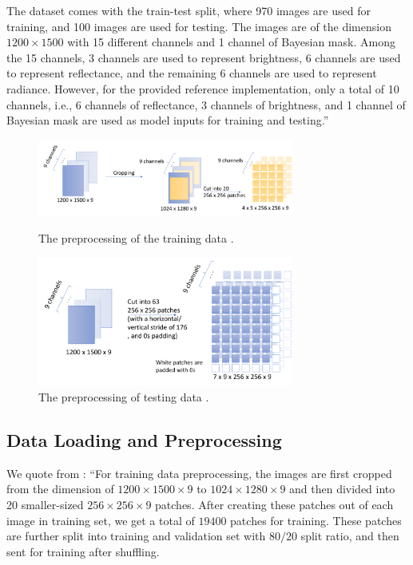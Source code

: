\documentclass[sigplan,screen]{acmart}
\begin{document}
The dataset comes with the train-test split, where 970 images are used for training, and 100 images are used for testing. 
The images are of the dimension $1200 \times 1500$ with 15 different channels and 1 channel of Bayesian mask. Among the 15 channels, 3 channels are used to represent brightness, 6 channels are used to represent reflectance, and the remaining 6 channels are used to represent radiance. However, for the provided reference implementation, only a total of 10 channels, i.e., 6 channels of reflectance, 3 channels of brightness, and 1 channel of Bayesian mask are used as model inputs for training and testing.'' 

\begin{figure}[htb]

\centering\includegraphics[width=0.75\textwidth]{images/cloudmask-preprocessing-training-data-2.pdf}
\caption{The preprocessing of the training data \cite{las-2023-cloudmask-related} .}
\label{fig:preprocessing-training}

\bigskip

\centering\includegraphics[width=0.75\textwidth]{images/cloudmask-preprocessing-testing-data-2.pdf}
\caption{The preprocessing of testing data \cite{las-2023-cloudmask-related}.}
\label{fig:preprocessing-testing}

\end{figure}

\subsection{Data Loading and Preprocessing} \label{sec:preprocessing}

We quote from \cite{las-2023-cloudmask-related}:  ``For training data preprocessing, the images are first cropped from the dimension of $1200 \times 1500 \times 9$ to $1024 \times 1280 \times 9$ and then divided into 20 smaller-sized $256 \times 256 \times 9$ patches. After creating these patches out of each image in training set, we get a total of $19400$ patches for training. These patches are further split into training and validation set with $80/20$ split ratio, and then sent for training after shuffling. 
\end{document}
